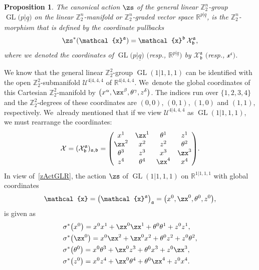 \documentclass[10pt,a4paper]{amsart}
\newcommand{\op}[1]{\operatorname{#1}}
\DeclareMathOperator{\GL}{GL}
\newcommand{\R}{{\mathbb R}}
\newcommand{\Z}{{\mathbb Z}}
\def\ul{\underline}
\def\ul{\underline}
\newcommand{\0}{\otimes}
\newcommand{\z}{\Z_2^n}
\numberwithin{equation}{section}
\newtheorem{Proposition}[Theorem]{Proposition}
 { \theoremstyle{definition}
\newtheorem{Definition}[Theorem]{Definition}
\newtheorem{Example}[Theorem]{Example}
\newtheorem{Remark}[Theorem]{Remark} }
\begin{document}
\begin{Proposition}
The canonical action $\zs$ of the general linear $\z$-group $\op{GL}\big(p|\ul q\big)$ on the linear $\z$-manifold or $\z$-graded vector space $\R^{p|\ul q}$, is the $\z$-morphism that is defined by the coordinate pullbacks
\begin{gather}\label{zActGLR}
\zs^*(\mathcal{x}^{\mathfrak{a}})=\mathcal{x}^{\mathfrak{b}}\,\mathcal{X}^{\mathfrak{a}}_{\mathfrak{b}},
\end{gather}
where we denoted the coordinates of $\op{GL}\big(p|\ul q\big)$ $($resp., $\R^{p|\ul q})$ by $\mathcal{X}^{\mathfrak{a}}_\mathfrak{b}$ $($resp., $\mathcal{x}^{\mathfrak{c}})$.
\end{Proposition}

\begin{Example}
We know that the general linear $\Z_2^2$-group $\GL(1|1,1,1)$ can be identified with the open $\Z^2_2$-submanifold $\mathcal{U}^{4|4,4,4}$ of $\R^{4|4,4,4}$. We~denote the global coordinates of this Cartesian $\Z^2_2$-manifold by $\big(x^\alpha, \zx^\beta, \theta^\gamma,z^\delta\big)$. The indices run over $\{1,2,3,4\}$ and the $\Z_2^2$-degrees of these coordinates are $(0,0)$, $(0,1)$, $(1,0)$ and $(1,1)$, respectively. We~already mentioned that if we view $\mathcal{U}^{4|4,4,4}$ as $\op{GL}(1|1,1,1)$, we must rearrange the coordinates:
\[
\mathcal{X}=(\mathcal{X}^{\mathfrak{a}}_{\mathfrak{b}})_{\mathfrak{a},\mathfrak{b}}=\left(
\begin{matrix}
 x^1 & \zx^1 & \theta^1 & z^1 \\
 \zx^2 &x^2 & z^2 & \theta^2 \\
 \theta^3 & z^3 & x^3 & \zx^3\\
 z^4 & \theta^4& \zx^4 & x^4\\
\end{matrix}
\right)\!.
\]
In view of~\eqref{zActGLR}, the action $\zs$ of $\op{GL}(1|1,1,1)$ on $\R^{1|1,1,1}$ with global co\-or\-di\-nates
\[
\mathcal{x}=\big(\mathcal{x}^{\mathfrak{a}}\big)_{\mathfrak{a}}=\big(x^0, \zx^0, \theta^0 , z^0\big),
\]
is given as
%
\begin{align*}
& \sigma^*\big(x^0\big) = x^0x^1 + \zx^0 \zx^1 + \theta^0 \theta^1 + z^0 z^1,\\
& \sigma^*\big(\zx^0\big) = x^0 \zx^2 + \zx^0 x^2 + \theta^0 z^2 + z^0 \theta^2,\\
& \sigma^*\big(\theta^0\big) = x^0 \theta^3 + \zx^0 z^3 + \theta^0 x^3 + z^0 \zx^3,\\
& \sigma^*\big(z^0\big) = x^0 z^4 + \zx^0 \theta^4 + \theta^0 \zx^4 + z^0 x^4.
\end{align*}
%
\end{Example}
\end{document}

